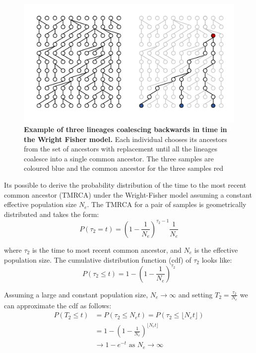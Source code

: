 \begin{figure}[h!]
    \centering
    \includegraphics[width=\linewidth]{figures/wright_fisher.pdf}
    \caption{\textbf{Example of three lineages coalescing backwards in time in the Wright Fisher model.} Each individual chooses its ancestors from the set of ancestors with replacement until all the lineages coalesce into a single common ancestor. The three samples are coloured blue and the common ancestor for the three samples red }
    \label{fig:coalescent}
\end{figure}

Its possible to derive the probability distribution of the time to the most recent common ancestor (TMRCA) under the Wright-Fisher model assuming a constant effective population size $N_e$. The TMRCA for a pair of samples is geometrically distributed and takes the form:
\begin{equation}
P(\tau_2 = t) = \left(1 - \frac{1}{N_e}\right)^{\tau_2-1} \frac{1}{N_e}
\end{equation}

where $\tau_2$ is the time to most recent common ancestor, and $N_e$ is the effective population size. The cumulative distribution function (cdf) of $\tau_2$ looks like:
\begin{equation}
P(\tau_2 \leq t) = 1 - \left(1 - \frac{1}{N_e}\right)^{\tau_2}
\end{equation}

Assuming a large and constant population size, $N_e \rightarrow \infty$ and setting $T_2 = \frac{\tau_2}{N_e}$ we can approximate the cdf as follows:
\begin{equation}
\begin{aligned}
    P(T_2 \leq t) &= P(\tau_2 \leq N_et) = P(\tau_2 \leq \lfloor N_et \rfloor) \\
    &= 1 - \left(1 - \frac{1}{N_e}\right)^{\lfloor N_et \rfloor} \\
    & \rightarrow 1 - e^{-t} \text{  as  } N_e \rightarrow \infty
\end{aligned}
\end{equation}


